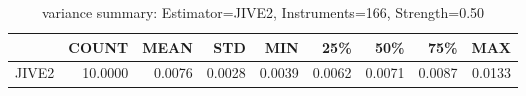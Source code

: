 \begin{table}[ht]
\centering
\caption{variance summary: Estimator=JIVE2, Instruments=166, Strength=0.50}
\begin{tabular}{lrrrrrrrr}
\toprule
 & COUNT & MEAN & STD & MIN & 25\% & 50\% & 75\% & MAX \\
\midrule
JIVE2 & 10.0000 & 0.0076 & 0.0028 & 0.0039 & 0.0062 & 0.0071 & 0.0087 & 0.0133 \\
\bottomrule
\end{tabular}
\end{table}

